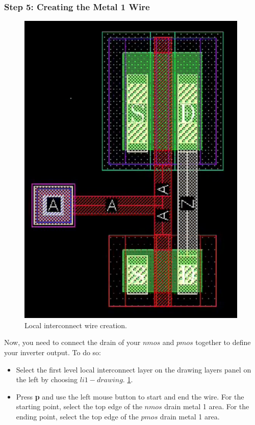 \subsubsection*{Step 5: Creating the Metal 1 Wire}
\parbox[t]{\dimexpr\textwidth-\leftmargin}{%
	\begin{figure}
		\vspace{-6mm}
		\centering
		\vspace{-\baselineskip}
		\includegraphics[scale=0.32]{figures/lab2/4}
		\caption{Local interconnect wire creation.}
		\label{layout_metal1}
	\end{figure}
	Now, you need to connect the drain of your $nmos$ and $pmos$ together to define your inverter output. To do so:
	\begin{itemize}
		\item Select the first level local interconnect layer on the drawing layers panel on the left by choosing $li1- drawing$. \ref{layout_metal1}.
		\item Press \textbf{p} and use the left mouse button to start and end the wire. For the starting point, select the top edge of the $nmos$ drain metal 1 area. For the ending point, select the top edge of the $pmos$ drain metal 1 area.\end{itemize}
}

